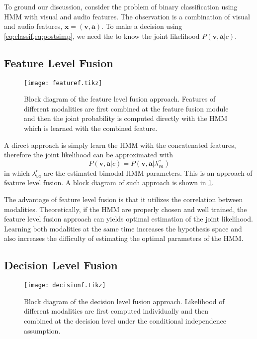 \documentclass[12pt,final,twoside]{report}
\begin{document}
To ground our discussion, consider the problem of binary classification using HMM with visual and audio features. The observation is a combination of visual and audio features, $\mathbf{x} = (\mathbf{v}, \mathbf{a})$. To make a decision using \cref{eq:classif,eq:postsimp}, we need the to know the joint likelihood $P(\mathbf{v},\mathbf{a}|c)$.

\subsection{Feature Level Fusion}
\begin{figure}[t]
  \centering
  \texttt{[image: featuref.tikz]}
  \caption[Block diagram of the feature level fusion approach.]{Block diagram of the feature level fusion approach. Features of different modalities are first combined at the feature fusion module and then the joint probability is computed directly with the HMM which is learned with the combined feature.}
  \label{fig:featuref}
\end{figure}

A direct approach is simply learn the HMM with the concatenated features, therefore the joint likelihood can be approximated with 
\begin{equation}
  P(\mathbf{v},\mathbf{a}|c) = P(\mathbf{v},\mathbf{a}|\lambda_{va}^c)
\end{equation}
in which $\lambda_{va}^c$ are the estimated bimodal HMM parameters. This is an approach of feature level fusion. A block diagram of such approach is shown in \cref{fig:featuref}.

The advantage of feature level fusion is that it utilizes the correlation between modalities. Theoretically, if the HMM are properly chosen and well trained, the feature level fusion approach can yields optimal estimation of the joint likelihood. Learning both modalities at the same time increases the hypothesis space and also increases the difficulty of estimating the optimal parameters of the HMM.

\subsection{Decision Level Fusion}
\begin{figure}[t]
  \centering
  \texttt{[image: decisionf.tikz]}
  \caption[Block diagram of the decision level fusion approach.]{Block diagram of the decision level fusion approach. Likelihood of different modalities are first computed individually and then combined at the decision level under the conditional independence assumption.}
  \label{fig:decisionf}
\end{figure}
\end{document}
